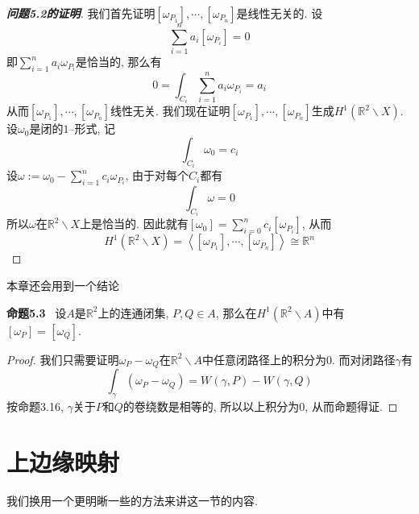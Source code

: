\documentclass[11pt]{article}
\theoremstyle{definition}\newtheorem*{analyse}{分析}
\theoremstyle{remark}\newtheorem{rem*}{评注}
\newenvironment{env}[1]{\par\vspace{1em}\noindent\textbf{#1}\ }{\par\vspace{1em}}
\begin{document}
\begin{proof}[{\bf 问题5.2的证明}]
    我们首先证明$[\omega_{P_1}],\cdots,[\omega_{P_n}]$是线性无关的.
    设
    \[\sum_{i=1}^na_i[\omega_{P_i}]=0\]
    即$\sum_{i=1}^na_i\omega_{P_i}$是恰当的, 那么有
    \[0=\int_{C_i}\sum_{i=1}^na_i\omega_{P_i}=a_i\]
    从而$[\omega_{P_1}],\cdots,[\omega_{P_n}]$线性无关.
    我们现在证明$[\omega_{P_1}],\cdots,[\omega_{P_n}]$生成$H^1(\mathbb{R}^2\backslash X)$.
    设$\omega_0$是闭的$1$--形式, 记
    \[\int_{C_i}\omega_0=c_i\]
    设$\omega:=\omega_0-\sum_{i=1}^nc_i\omega_{P_i}$, 由于对每个$C_i$都有
    \[\int_{C_i}\omega=0\]
    所以$\omega$在$\mathbb{R}^2\backslash X$上是恰当的.
    因此就有$[\omega_0]=\sum_{i=0}^nc_i[\omega_{P_i}]$, 从而
    \[H^1(\mathbb{R}^2\backslash X)=\left\langle[\omega_{P_1}],\cdots,[\omega_{P_n}]\right\rangle\cong\mathbb{R}^n\]
\end{proof}

本章还会用到一个结论
\begin{env}{命题5.3}
    设$A$是$\mathbb{R}^2$上的连通闭集, $P,Q\in A$, 那么在$H^1(\mathbb{R}^2\backslash A)$中有$[\omega_P]=[\omega_Q]$.
\end{env}
\begin{proof}
    我们只需要证明$\omega_P-\omega_Q$在$\mathbb{R}^2\backslash A$中任意闭路径上的积分为$0$.
    而对闭路径$\gamma$有
    \[\int_{\gamma}(\omega_P-\omega_Q)=W(\gamma,P)-W(\gamma,Q)\]
    按命题3.16, $\gamma$关于$P$和$Q$的卷绕数是相等的, 所以以上积分为$0$, 从而命题得证.
\end{proof}

\section{上边缘映射}
我们换用一个更明晰一些的方法来讲这一节的内容.
\end{document}
